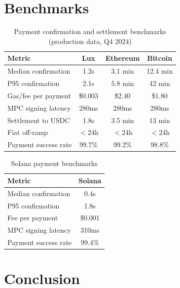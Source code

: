 \documentclass[11pt]{article}
\begin{document}
\section{Benchmarks}
\label{sec:benchmarks}

\begin{table}[htbp]
\centering
\caption{Payment confirmation and settlement benchmarks (production data, Q4 2024)}
\label{tab:benchmarks}
\begin{tabular}{@{}lccc@{}}
\toprule
\textbf{Metric} & \textbf{Lux} & \textbf{Ethereum} & \textbf{Bitcoin} \\
\midrule
Median confirmation      & 1.2s    & 3.1 min  & 12.4 min \\
P95 confirmation         & 2.1s    & 5.8 min  & 42 min \\
Gas/fee per payment      & \$0.003 & \$2.40   & \$1.80 \\
MPC signing latency      & 280ms   & 280ms    & 280ms \\
Settlement to USDC       & 1.8s    & 3.5 min  & 13 min \\
Fiat off-ramp            & $<$24h  & $<$24h   & $<$24h \\
Payment success rate      & 99.7\%  & 99.2\%   & 98.8\% \\
\bottomrule
\end{tabular}
\end{table}

\begin{table}[htbp]
\centering
\caption{Solana payment benchmarks}
\label{tab:solana}
\begin{tabular}{@{}lc@{}}
\toprule
\textbf{Metric} & \textbf{Solana} \\
\midrule
Median confirmation   & 0.4s \\
P95 confirmation      & 1.8s \\
Fee per payment       & \$0.001 \\
MPC signing latency   & 310ms \\
Payment success rate  & 99.4\% \\
\bottomrule
\end{tabular}
\end{table}

\section{Conclusion}
\label{sec:conclusion}
\end{document}
